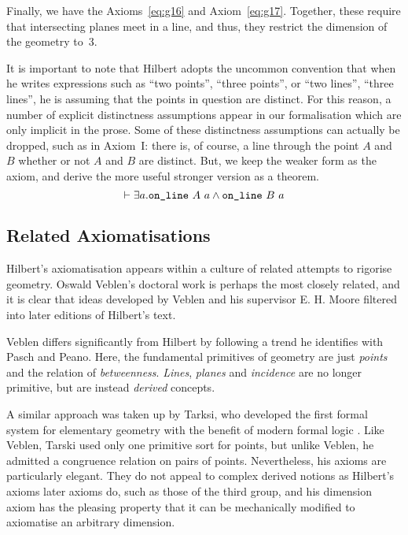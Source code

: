 Finally, we have the Axioms~\ref{eq:g16} and Axiom~\ref{eq:g17}. Together, these require that intersecting planes meet in a line, and thus, they restrict the dimension of the geometry to~3.

It is important to note that Hilbert adopts the uncommon convention that when he writes expressions such as ``two points'', ``three points'', or ``two lines'', ``three lines'', he is assuming that the points in question are distinct. For this reason, a number of explicit distinctness assumptions appear in our formalisation which are only implicit in the prose. Some of these distinctness assumptions can actually be dropped, such as in Axiom~I: there is, of course, a line through the point $A$ and $B$ whether or not $A$ and $B$ are distinct. But, we keep the weaker form as the axiom, and derive the more useful stronger version as a theorem.
\begin{displaymath}
  \vdash \exists a. \texttt{on\_line}\ A\ a \wedge \texttt{on\_line}\ B\ a
\end{displaymath}

\subsection{Related Axiomatisations}
Hilbert's axiomatisation appears within a culture of related attempts to rigorise geometry. Oswald Veblen's doctoral work \cite{Veblenphd} is perhaps the most closely related, and it is clear that ideas developed by Veblen and his supervisor E. H. Moore filtered into later editions of Hilbert's text.

Veblen differs significantly from Hilbert by following a trend he identifies with Pasch and Peano. Here, the fundamental primitives of geometry are just \emph{points} and the relation of \emph{betweenness}. \emph{Lines}, \emph{planes} and \emph{incidence} are no longer primitive, but are instead \emph{derived} concepts. 

A similar approach was taken up by Tarksi, who developed the first formal system for elementary geometry with the benefit of modern formal logic \cite{TarskiGeometrySystem}. Like Veblen, Tarski used only one primitive sort for points, but unlike Veblen, he admitted a congruence relation on pairs of points. Nevertheless, his axioms are particularly elegant. They do not appeal to complex derived notions as Hilbert's axioms later axioms do, such as those of the third group, and his dimension axiom has the pleasing property that it can be mechanically modified to axiomatise an arbitrary dimension.


